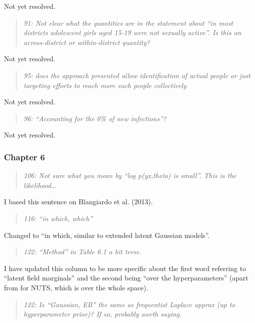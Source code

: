 \documentclass[
  12pt,
]{article}
\begin{document}
Not yet resolved.

\begin{quote}
\emph{91: Not clear what the quantities are in the statement about ``in
most districts adolescent girls aged 15-19 were not sexually active''.
Is this an across-district or within-district quantity?}
\end{quote}

Not yet resolved.

\begin{quote}
\emph{95: does the approach presented allow identification of actual
people or just targeting efforts to reach more such people collectively}
\end{quote}

Not yet resolved.

\begin{quote}
\emph{96: ``Accounting for the 0\% of new infections''?}
\end{quote}

Not yet resolved.

\subsubsection{Chapter 6}\label{chapter-6-1}

\begin{quote}
\emph{106: Not sure what you mean by ``log p(y\textbar x,theta) is
small''. This is the likelihood\ldots{}}
\end{quote}

I based this sentence on Blangiardo et al. (2013).

\begin{quote}
\emph{116: ``in which, which''}
\end{quote}

Changed to ``in which, similar to extended latent Gaussian models''.

\begin{quote}
\emph{122: ``Method'' in Table 6.1 a bit terse.}
\end{quote}

I have updated this column to be more specific about the first word
referring to ``latent field marginals'' and the second being ``over the
hyperparameters'' (apart from for NUTS, which is over the whole space).

\begin{quote}
\emph{122: Is ``Gaussian, EB'' the same as frequentist Laplace approx
(up to hyperparameter prior)? If so, probably worth saying.}
\end{quote}
\end{document}
